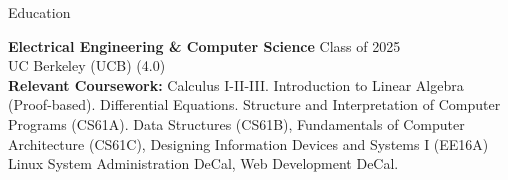 \begin{rSection}{Education}

{\bf Electrical Engineering \& Computer Science}  \hfill {Class of 2025} \\ UC Berkeley (UCB) (4.0) 
\\ {\bf Relevant Coursework:}  Calculus I-II-III.
Introduction to Linear Algebra (Proof-based).
Differential Equations. 
Structure and Interpretation of Computer Programs (CS61A).
Data Structures (CS61B), Fundamentals of Computer Architecture (CS61C),  Designing Information Devices and Systems I (EE16A)
Linux System Administration DeCal, Web Development DeCal.

\end{rSection}